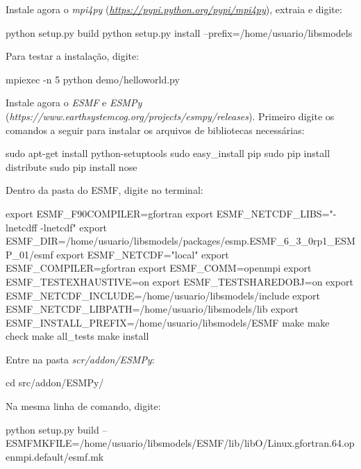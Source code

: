 \noindent Instale agora o \textit{mpi4py} (\textcolor{bleu_cite}{\href{https://pypi.python.org/pypi/mpi4py}{\textit{https://pypi.python.org/pypi/mpi4py}}}), extraia e digite:
\bigskip

\begin{bashcode}
python setup.py build
python setup.py install --prefix=/home/usuario/libsmodels
\end{bashcode}
\bigskip

\noindent Para testar a instalação, digite:
\bigskip

\begin{bashcode}
mpiexec -n 5 python demo/helloworld.py
\end{bashcode}
\bigskip

\noindent Instale agora o \textit{ESMF} e \textit{ESMPy} (\textcolor{bleu_cite}{\textit{https://www.earthsystemcog.org/projects/esmpy/releases}}). Primeiro digite os comandos a seguir para instalar os arquivos de bibliotecas necessárias:
\bigskip

\begin{bashcode}
sudo apt-get install python-setuptools
sudo easy_install pip
sudo pip install distribute
sudo pip install nose
\end{bashcode}
\bigskip

\noindent Dentro da pasta do ESMF, digite no terminal:
\bigskip

\begin{bashcode}[fontsize=\footnotesize]
export ESMF_F90COMPILER=gfortran
export ESMF_NETCDF_LIBS="-lnetcdff -lnetcdf"
export ESMF_DIR=/home/usuario/libsmodels/packages/esmp.ESMF_6_3_0rp1_ESMP_01/esmf
export ESMF_NETCDF="local"
export ESMF_COMPILER=gfortran
export ESMF_COMM=openmpi
export ESMF_TESTEXHAUSTIVE=on
export ESMF_TESTSHAREDOBJ=on
export ESMF_NETCDF_INCLUDE=/home/usuario/libsmodels/include
export ESMF_NETCDF_LIBPATH=/home/usuario/libsmodels/lib
export ESMF_INSTALL_PREFIX=/home/usuario/libsmodels/ESMF
make
make check
make all_tests
make install
\end{bashcode}
\bigskip

\noindent Entre na pasta \textit{scr/addon/ESMPy}:
\bigskip

\begin{bashcode}
cd src/addon/ESMPy/
\end{bashcode}
\bigskip

\noindent Na mesma linha de comando, digite:
\bigskip

\begin{bashcode}[fontsize=\footnotesize]
python setup.py build
--ESMFMKFILE=/home/usuario/libsmodels/ESMF/lib/libO/Linux.gfortran.64.openmpi.default/esmf.mk
\end{bashcode}
\bigskip

